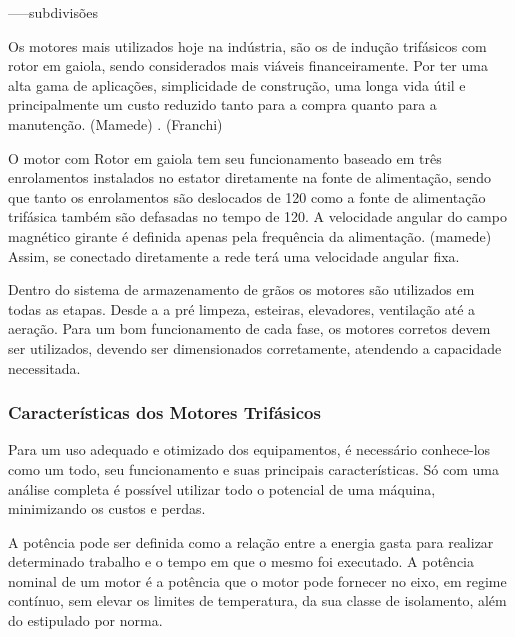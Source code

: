 -----subdivisões 

Os motores mais utilizados hoje na indústria, são os de indução trifásicos com rotor em gaiola, sendo considerados mais viáveis financeiramente. Por ter uma alta gama de aplicações, simplicidade de construção, uma longa vida útil e principalmente um  custo reduzido tanto para a compra quanto para a manutenção. (Mamede) . (Franchi)  %

O motor com Rotor em gaiola tem seu funcionamento baseado em três enrolamentos instalados no estator diretamente na fonte de alimentação, sendo que tanto os enrolamentos são deslocados de 120 como a fonte de alimentação trifásica também são defasadas no tempo de 120. A velocidade angular do campo magnético girante é  definida apenas pela frequência da alimentação. (mamede) %
Assim, se conectado diretamente a rede terá uma velocidade angular fixa.



Dentro do sistema de armazenamento de grãos os motores são utilizados em todas as etapas.
Desde a a pré limpeza, esteiras, elevadores, ventilação até a aeração. Para um bom funcionamento de cada fase, os motores corretos devem ser utilizados, devendo ser  dimensionados  corretamente, atendendo a capacidade  necessitada. 



\subsubsection{Características dos Motores Trifásicos}

Para um uso adequado e otimizado dos equipamentos, é necessário conhece-los como um todo, seu funcionamento e suas principais características. Só com uma análise completa é possível utilizar todo o potencial de uma máquina, minimizando os custos e perdas.


A potência  pode ser definida como a relação entre a energia gasta para realizar determinado trabalho e o tempo em que o mesmo foi executado. A potência nominal de um motor é a potência que o motor pode fornecer no eixo, em regime contínuo, sem elevar os limites de temperatura, da sua classe de isolamento, além do estipulado por norma.

